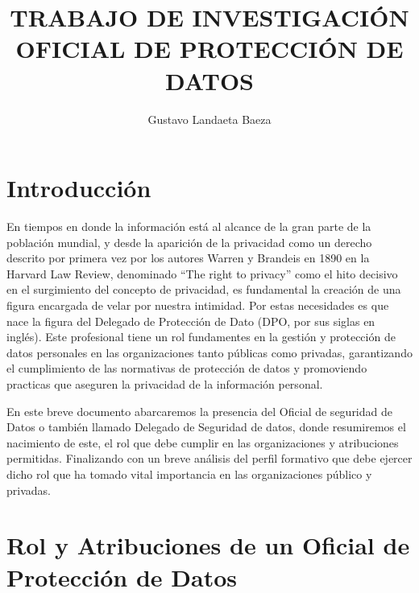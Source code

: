 \documentclass[stu, 11pt, letterpaper, donotrepeattitle, floatsintext, natbib]{apa7}
\title{\Large  TRABAJO DE INVESTIGACIÓN \\ OFICIAL DE PROTECCIÓN DE DATOS}
\author{Gustavo Landaeta Baeza } %
\begin{document}
\maketitle


\renewcommand\contentsname{\largeÍndice}
\tableofcontents
\setcounter{tocdepth}{2}
\newpage


\section{\large Introducción}

\justify

\hspace{1.27cm} En tiempos en donde la información está al alcance de la gran parte de la población mundial, y desde la aparición de la privacidad como un derecho descrito por primera vez por los autores Warren y Brandeis en 1890 en la Harvard Law
Review, denominado “The right to privacy” \citep{warren1995} como el hito decisivo en el surgimiento del concepto de privacidad, es fundamental la creación de una figura encargada de velar por nuestra intimidad. Por estas necesidades es que nace la figura del Delegado de Protección de Dato (DPO, por sus siglas en inglés). Este profesional tiene un rol fundamentes en la gestión y protección de datos personales en las organizaciones tanto públicas como privadas, garantizando el cumplimiento de las normativas de protección de datos y promoviendo practicas que aseguren la privacidad de la información personal.

En este breve documento abarcaremos la presencia del Oficial de seguridad de Datos o también llamado Delegado de Seguridad de datos, donde resumiremos el nacimiento de este, el rol que debe cumplir en las organizaciones y atribuciones permitidas.  Finalizando con un breve análisis del perfil formativo que debe ejercer dicho rol que ha tomado vital importancia en las organizaciones público y privadas.

\hfill \break 


\newpage

\section{\large Rol y Atribuciones de un Oficial de Protección de Datos}
\end{document}
